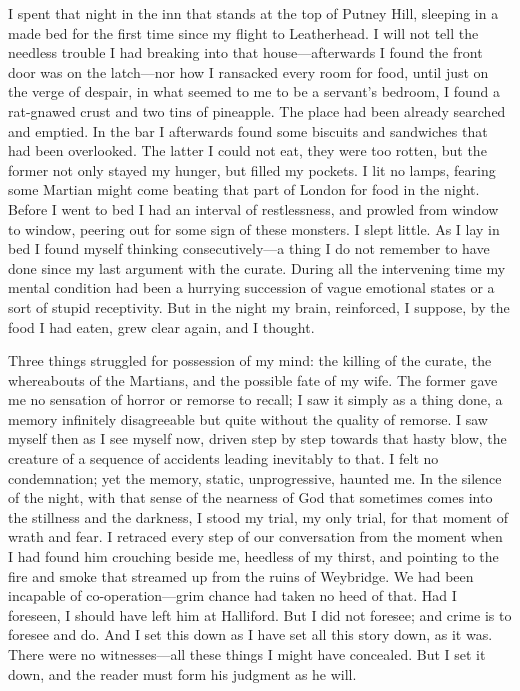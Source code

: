 

	\lettrine[lines=4]{I}{} spent that night in the inn that stands at the top of Putney Hill, sleeping in a made bed for the first time since my flight to Leatherhead. I will not tell the needless trouble I had breaking into that house—afterwards I found the front door was on the latch—nor how I ransacked every room for food, until just on the verge of despair, in what seemed to me to be a servant's bedroom, I found a rat-gnawed crust and two tins of pineapple. The place had been already searched and emptied. In the bar I afterwards found some biscuits and sandwiches that had been overlooked. The latter I could not eat, they were too rotten, but the former not only stayed my hunger, but filled my pockets. I lit no lamps, fearing some Martian might come beating that part of London for food in the night. Before I went to bed I had an interval of restlessness, and prowled from window to window, peering out for some sign of these monsters. I slept little. As I lay in bed I found myself thinking consecutively—a thing I do not remember to have done since my last argument with the curate. During all the intervening time my mental condition had been a hurrying succession of vague emotional states or a sort of stupid receptivity. But in the night my brain, reinforced, I suppose, by the food I had eaten, grew clear again, and I thought.

Three things struggled for possession of my mind: the killing of the curate, the whereabouts of the Martians, and the possible fate of my wife. The former gave me no sensation of horror or remorse to recall; I saw it simply as a thing done, a memory infinitely disagreeable but quite without the quality of remorse. I saw myself then as I see myself now, driven step by step towards that hasty blow, the creature of a sequence of accidents leading inevitably to that. I felt no condemnation; yet the memory, static, unprogressive, haunted me. In the silence of the night, with that sense of the nearness of God that sometimes comes into the stillness and the darkness, I stood my trial, my only trial, for that moment of wrath and fear. I retraced every step of our conversation from the moment when I had found him crouching beside me, heedless of my thirst, and pointing to the fire and smoke that streamed up from the ruins of Weybridge. We had been incapable of co-operation—grim chance had taken no heed of that. Had I foreseen, I should have left him at Halliford. But I did not foresee; and crime is to foresee and do. And I set this down as I have set all this story down, as it was. There were no witnesses—all these things I might have concealed. But I set it down, and the reader must form his judgment as he will.

